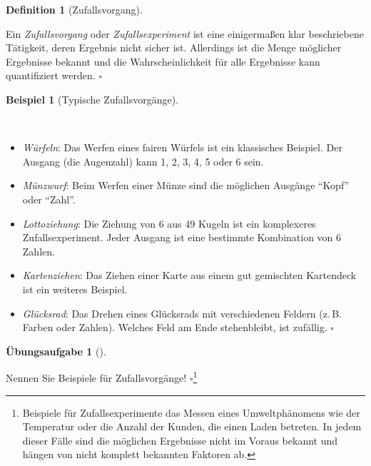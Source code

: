 \documentclass[
  ngerman,
  letterpaper,
  twoside,
  open=any]{scrbook}
\providecommand{\tightlist}{%
  \setlength{\itemsep}{0pt}\setlength{\parskip}{0pt}}\usepackage{longtable,booktabs,array}
\theoremstyle{definition}
\newtheorem{example}{Beispiel}[chapter]
\theoremstyle{plain}
\theoremstyle{definition}
\newtheorem{exercise}{Übungsaufgabe}[chapter]
\theoremstyle{definition}
\newtheorem{definition}{Definition}[chapter]
\theoremstyle{definition}
\newtheorem{example}{Beispiel}[chapter]
\theoremstyle{definition}
\newtheorem{exercise}{Übungsaufgabe}[chapter]
\theoremstyle{remark}
\begin{document}
\begin{definition}[Zufallsvorgang]\protect\hypertarget{def-zufallsvorgang}{}\label{def-zufallsvorgang}

Ein \emph{Zufallsvorgang} oder \emph{Zufallsexperiment} ist eine
einigermaßen klar beschriebene Tätigkeit, deren Ergebnis nicht sicher
ist. Allerdings ist die Menge möglicher Ergebnisse bekannt und die
Wahrscheinlichkeit für alle Ergebnisse kann quantifiziert werden.
\(\square\)

\end{definition}

\begin{example}[Typische
Zufallsvorgänge]\protect\hypertarget{exm-zufallsvorgang}{}\label{exm-zufallsvorgang}

~

\begin{itemize}
\tightlist
\item
  \emph{Würfeln}: Das Werfen eines fairen Würfels ist ein klassisches
  Beispiel. Der Ausgang (die Augenzahl) kann 1, 2, 3, 4, 5 oder 6 sein.
\item
  \emph{Münzwurf}: Beim Werfen einer Münze sind die möglichen Ausgänge
  \enquote{Kopf} oder \enquote{Zahl}.
\item
  \emph{Lottoziehung}: Die Ziehung von 6 aus 49 Kugeln ist ein
  komplexeres Zufallsexperiment. Jeder Ausgang ist eine bestimmte
  Kombination von 6 Zahlen.
\item
  \emph{Kartenziehen}: Das Ziehen einer Karte aus einem gut gemischten
  Kartendeck ist ein weiteres Beispiel.
\item
  \emph{Glücksrad}: Das Drehen eines Glücksrads mit verschiedenen
  Feldern (z.\,B. Farben oder Zahlen). Welches Feld am Ende
  stehenbleibt, ist zufällig. \(\square\)
\end{itemize}

\end{example}

\begin{exercise}[]\protect\hypertarget{exr-zufall2}{}\label{exr-zufall2}

Nennen Sie Beispiele für Zufallsvorgänge! \(\square\)\footnote{Beispiele
  für Zufallsexperimente das Messen eines Umweltphänomens wie der
  Temperatur oder die Anzahl der Kunden, die einen Laden betreten. In
  jedem dieser Fälle sind die möglichen Ergebnisse nicht im Voraus
  bekannt und hängen von nicht komplett bekannten Faktoren ab.}

\end{exercise}
\end{document}
